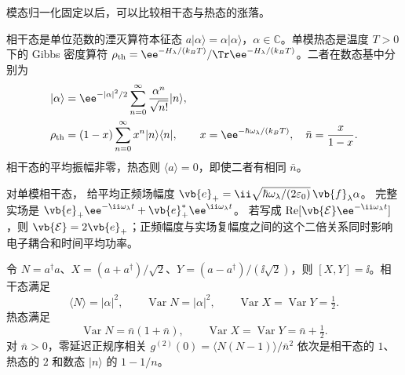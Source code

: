 模态归一化固定以后，可以比较相干态与热态的涨落。
\label{sec:feqo-coherent-thermal}
\begin{definition}[相干态与单模热态]
相干态是单位范数的湮灭算符本征态 $a|\alpha\rangle=\alpha|\alpha\rangle$，$\alpha\in\mathbb C$。单模热态是温度 $T>0$ 下的 Gibbs 密度算符 $\rho_{\rm th}=\ee^{-H_\lambda/(k_BT)}/\Tr\ee^{-H_\lambda/(k_BT)}$。二者在数态基中分别为
\begin{align}
 |\alpha\rangle&=\ee^{-|\alpha|^2/2}\sum_{n=0}^\infty\frac{\alpha^n}{\sqrt{n!}}|n\rangle,
 \label{eq:feqo-coherent-state}\\
 \rho_{\rm th}&=(1-x)\sum_{n=0}^\infty x^n|n\rangle\langle n|,
 \qquad x=\ee^{-\hbar\omega_\lambda/(k_BT)},\quad
 \bar n=\frac{x}{1-x}.
 \label{eq:feqo-thermal-state}
\end{align}
相干态的平均振幅非零，热态则 $\langle a\rangle=0$，即使二者有相同 $\bar n$。
\end{definition}

对单模相干态， 给平均正频场幅度
$\vb{e}_+=\ii\sqrt{\hbar\omega_\lambda/(2\varepsilon_0)}\,\vb{f}_\lambda\alpha$。
完整实场是 $\vb{e}_+\ee^{-\ii\omega_\lambda t}+\vb{e}_+^*\ee^{\ii\omega_\lambda t}$。
若写成 $\operatorname{Re}[\vb{\mathcal E}\ee^{-\ii\omega_\lambda t}]$，则 $\vb{\mathcal E}=2\vb{e}_+$；正频幅度与实场复幅度之间的这个二倍关系同时影响电子耦合和时间平均功率。

\begin{proposition}
令 $N=a^\dagger a$、$X=(a+a^\dagger)/\sqrt2$、$Y=(a-a^\dagger)/(\ii\sqrt2)$，则 $[X,Y]=\ii$。相干态满足
\begin{equation}
 \langle N\rangle=|\alpha|^2,\qquad
 \operatorname{Var}N=|\alpha|^2,\qquad
 \operatorname{Var}X=\operatorname{Var}Y=\tfrac12.
 \label{eq:feqo-coherent-variances}
\end{equation}
热态满足
\begin{equation}
 \operatorname{Var}N=\bar n(1+\bar n),\qquad
 \operatorname{Var}X=\operatorname{Var}Y=\bar n+\tfrac12.
 \label{eq:feqo-thermal-variances}
\end{equation}
对 $\bar n>0$，零延迟正规序相关 $g^{(2)}(0)=\langle N(N-1)\rangle/\bar n^2$ 依次是相干态的 $1$、热态的 $2$ 和数态 $|n\rangle$ 的 $1-1/n$。
\end{proposition}

